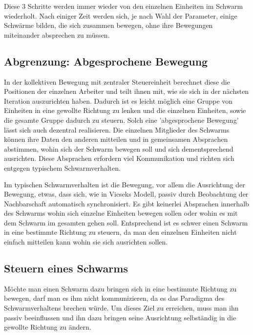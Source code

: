Diese 3 Schritte werden immer wieder von den einzelnen Einheiten im Schwarm wiederholt. Nach einiger Zeit werden sich, je nach Wahl der Parameter, einige Schwärme bilden, die sich zusammen bewegen, ohne ihre Bewegungen miteinander absprechen zu müssen.\cite{VicsekPatterns}

\subsection{Abgrenzung: Abgesprochene Bewegung}\label{subsec:AbgesprocheneBewegung}

In der kollektiven Bewegung mit zentraler Steuereinheit berechnet diese die Positionen der einzelnen Arbeiter und teilt ihnen mit, wie sie sich in der nächsten Iteration auszurichten haben.
Dadurch ist es leicht möglich eine Gruppe von Einheiten in eine gewollte Richtung zu lenken und die einzelnen Einheiten, sowie die gesamte Gruppe dadurch zu steuern.
Solch eine 'abgesprochene Bewegung' lässt sich auch dezentral realisieren.
Die einzelnen Mitglieder des Schwarms können ihre Daten den anderen mitteilen und in gemeinsamen Absprachen abstimmen, wohin sich der Schwarm bewegen soll und sich dementsprechend ausrichten.
Diese Absprachen erfordern viel Kommunikation und richten sich entgegen typischem Schwarmverhalten.

Im typischen Schwarmverhalten ist die Bewegung, vor allem die Ausrichtung der Bewegung, etwas, dass sich, wie in Vicseks Modell, passiv durch Beobachtung der Nachbarschaft automatisch synchronisiert.
Es gibt keinerlei Absprachen innerhalb des Schwarms wohin sich einzelne Einheiten bewegen sollen oder wohin es mit dem Schwarm im gesamten gehen soll.
Entsprechend ist es schwer einen Schwarm in eine bestimmte Richtung zu steuern, da man den einzelnen Einheiten nicht einfach mitteilen kann wohin sie sich ausrichten sollen.

\subsection{Steuern eines Schwarms}\label{subsec:SchwarmSteuern}

Möchte man einen Schwarm dazu bringen sich in eine bestimmte Richtung zu bewegen, darf man es ihm nicht kommunizieren, da es das Paradigma des Schwarmverhaltens brechen würde.
Um dieses Ziel zu erreichen, muss man ihn passiv beeinflussen und ihn dazu bringen seine Ausrichtung selbständig in die gewollte Richtung zu ändern.

